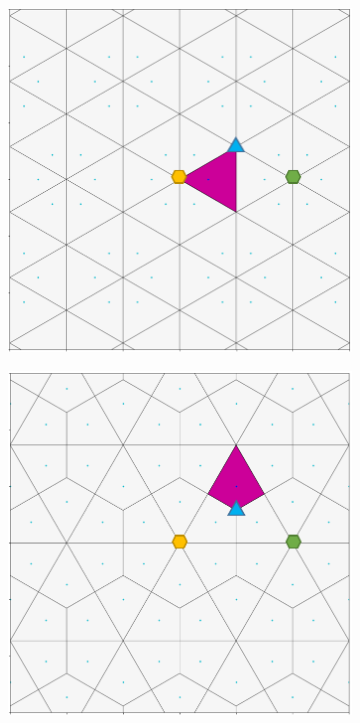 \documentclass[12pt]{article}
\begin{document}
  \begin{figure}[H]
  \begin{subfigure}[b]{0.32\textwidth}
    \includegraphics[width=.9\textwidth]{dirih_1.png}
    \label{fig:f1}
  \end{subfigure}
  \begin{subfigure}[b]{0.32\textwidth}
    \includegraphics[width=.9\textwidth]{dirih_3.png}

\end{subfigure}
\end{figure}
\end{document}
